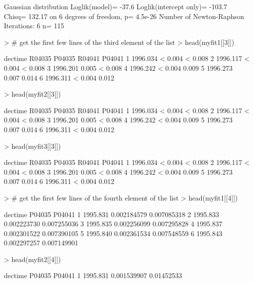 \documentclass[11pt]{article}
\begin{document}
\begin{Schunk}
\begin{Soutput}
Gaussian distribution
Loglik(model)= -37.6   Loglik(intercept only)= -103.7
	Chisq= 132.17 on 6 degrees of freedom, p= 4.5e-26 
Number of Newton-Raphson Iterations: 6 
n= 115 
\end{Soutput}
\begin{Sinput}
> # get the first few lines of the third element of the list
> head(myfit1[[3]])
\end{Sinput}
\begin{Soutput}
   dectime R04035 P04035 R04041 P04041
1 1996.034      <  0.004      <  0.008
2 1996.117      <  0.004      <  0.008
3 1996.201         0.005      <  0.008
4 1996.242      <  0.004         0.009
5 1996.273         0.007         0.014
6 1996.311      <  0.004         0.012
\end{Soutput}
\begin{Sinput}
> head(myfit2[[3]])
\end{Sinput}
\begin{Soutput}
   dectime R04035 P04035 R04041 P04041
1 1996.034      <  0.004      <  0.008
2 1996.117      <  0.004      <  0.008
3 1996.201         0.005      <  0.008
4 1996.242      <  0.004         0.009
5 1996.273         0.007         0.014
6 1996.311      <  0.004         0.012
\end{Soutput}
\begin{Sinput}
> head(myfit3[[3]])
\end{Sinput}
\begin{Soutput}
   dectime R04035 P04035 R04041 P04041
1 1996.034      <  0.004      <  0.008
2 1996.117      <  0.004      <  0.008
3 1996.201         0.005      <  0.008
4 1996.242      <  0.004         0.009
5 1996.273         0.007         0.014
6 1996.311      <  0.004         0.012
\end{Soutput}
\begin{Sinput}
> # get the first few lines of the fourth element of the list
> head(myfit1[[4]])
\end{Sinput}
\begin{Soutput}
   dectime      P04035      P04041
1 1995.831 0.002184579 0.007085318
2 1995.833 0.002223730 0.007255036
3 1995.835 0.002256099 0.007295828
4 1995.837 0.002301522 0.007390105
5 1995.840 0.002361534 0.007548559
6 1995.843 0.002297257 0.007149901
\end{Soutput}
\begin{Sinput}
> head(myfit2[[4]])
\end{Sinput}
\begin{Soutput}
   dectime      P04035     P04041
1 1995.831 0.001539907 0.01452533

\end{Soutput}
\end{Schunk}
\end{document}
